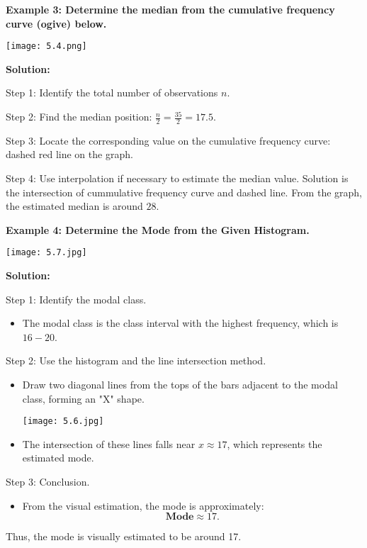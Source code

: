 \begin{flushleft}
	\textbf{Example 3: Determine the median from the cumulative frequency curve (ogive) below.}
	
	\vspace{0.5cm}
	
	\begin{center}
		\texttt{[image: 5.4.png]}
	\end{center}
	
	\vspace{0.5cm}
	\textbf{Solution:}
	\vspace{0.5cm}
	
	Step 1: Identify the total number of observations $n$.
	
	Step 2: Find the median position: $\frac{n}{2} = \frac{35}{2}=17.5$.
	
	Step 3: Locate the corresponding value on the cumulative frequency curve: dashed red line on the graph.
	
	Step 4: Use interpolation if necessary to estimate the median value.
	Solution is the intersection of cummulative frequency curve and dashed line.
	From the graph, the estimated median is around $28$.
\end{flushleft}
\begin{flushleft}
	\textbf{Example 4: Determine the Mode from the Given Histogram.}
	\begin{center}
		\texttt{[image: 5.7.jpg]}
		
	\end{center}
	
	\textbf{Solution:}
	
	Step 1: Identify the modal class.
	\begin{itemize}
		\item The modal class is the class interval with the highest frequency, which is $16-20$.
	\end{itemize}
	
	Step 2: Use the histogram and the line intersection method.
	\begin{itemize}
		\item Draw two diagonal lines from the tops of the bars adjacent to the modal class, forming an "X" shape.
		\begin{center}
			\texttt{[image: 5.6.jpg]}
		\end{center}
		\item The intersection of these lines falls near $x \approx 17$, which represents the estimated mode.
	\end{itemize}
	
	Step 3: Conclusion.
	\begin{itemize}
		\item From the visual estimation, the mode is approximately:
		\[
		\textbf{Mode} \approx 17.
		\]
	\end{itemize}
	
	\vspace{0.5cm}
	
	
	Thus, the mode is visually estimated to be around 17.
\end{flushleft}
